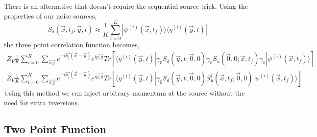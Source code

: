 \documentclass[3p,preprint]{elsarticle}
\begin{document}
There is an alternative that doesn't require the sequential source trick. Using the properties of our noise sources,
\begin{equation}
S_d(\vec{x},t_f;\vec{y},t) \approx \frac{1}{K} \sum_{i=0}^K | \psi^{(i)}(\vec{x},t_f) \rangle \langle \eta^{(i)}(\vec{y},t) |
\end{equation}
the three point correlation function becomes,
\begin{eqnarray}
Z_V \frac{1}{K} \sum_{i=0}^K \sum_{\vec{x} \vec{y} } e^{-i\vec{p_f}(\vec{x} - \vec{y}) } e^{i\vec{p_i} \vec{y}} Tr \left[  \langle \eta^{(i)}(\vec{y},t) | \gamma_0 S_d(\vec{y},t;\vec{0},0) \gamma_5  S_u(\vec{0},0;\vec{x},t_f) \gamma_5 | \psi^{(i)}(\vec{x},t_f) \rangle \right] \\
Z_V \frac{1}{K} \sum_{i=0}^K \sum_{\vec{x} \vec{y} } e^{-i\vec{p_f}(\vec{x} - \vec{y}) } e^{i\vec{p_i} \vec{y}} Tr \left[  \langle \eta^{(i)}(\vec{y},t) | \gamma_0 S_d(\vec{y},t;\vec{0},0) S_u^{\dagger}(\vec{x},t_f;\vec{0},0) | \psi^{(i)}(\vec{x},t_f) \rangle \right]
\end{eqnarray}
Using this method we can inject arbitrary momentum at the source without the need for extra inversions.



\subsection{Two Point Function}
\end{document}
